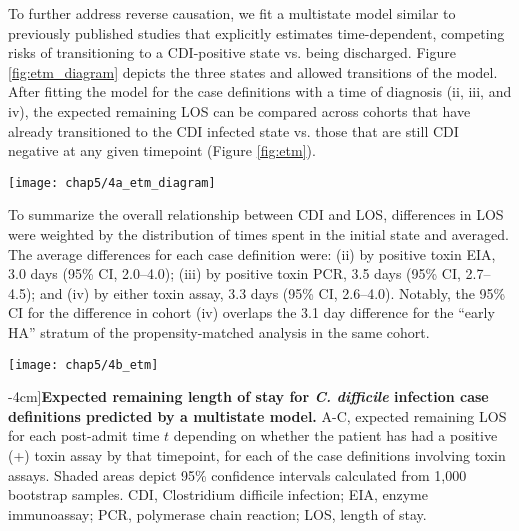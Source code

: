 To further address reverse causation, we fit a multistate model similar to previously published studies\autocite{Mitchell2014,Stevens2015,VanKleef2014} that explicitly estimates time-dependent, competing risks of transitioning to a CDI-positive state vs. being discharged. Figure \ref{fig:etm_diagram} depicts the three states and allowed transitions of the model. After fitting the model for the case definitions with a time of diagnosis (ii, iii, and iv), the expected remaining LOS can be compared across cohorts that have already transitioned to the CDI infected state vs. those that are still CDI negative at any given timepoint (Figure \ref{fig:etm}).
\begin{marginfigure}
  \texttt{[image: chap5/4a\_etm\_diagram]}               
  \caption[Multistate model of \emph{C. difficile} infection]{\textbf{Multistate model of \emph{C. difficile} infection.} Three states of the multistate model and allowed transitions. Patients may only transition in the direction of the arrows.}
  \label{fig:etm_diagram}
\end{marginfigure}
To summarize the overall relationship between CDI and LOS, differences in LOS were weighted by the distribution of times spent in the initial state and averaged. The average differences for each case definition were: (ii) by positive toxin EIA, 3.0 days (95\% CI, 2.0–4.0); (iii) by positive toxin PCR, 3.5 days (95\% CI, 2.7–4.5); and (iv) by either toxin assay, 3.3 days (95\% CI, 2.6–4.0). Notably, the 95\% CI for the difference in cohort (iv) overlaps the 3.1 day difference for the “early HA” stratum of the propensity-matched analysis in the same cohort.

\begin{figure*}[htb]
  \centering
  \texttt{[image: chap5/4b\_etm]}
  \caption[Expected remaining length of stay for \emph{C. difficile} infection case definitions as predicted by a multistate model][-4cm]{\textbf{Expected remaining length of stay for \emph{C. difficile} infection case definitions predicted by a multistate model.} A-C, expected remaining LOS for each post-admit time $t$ depending on whether the patient has had a positive (+) toxin assay by that timepoint, for each of the case definitions involving toxin assays. Shaded areas depict 95\% confidence intervals calculated from 1,000 bootstrap samples. CDI, Clostridium difficile infection; EIA, enzyme immunoassay; PCR, polymerase chain reaction; LOS, length of stay.
  }
  \label{fig:etm}
\end{figure*}


